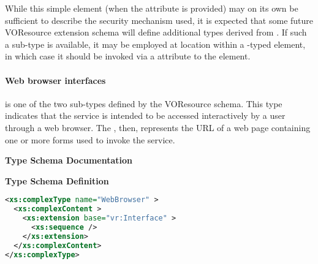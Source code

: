 \documentclass[11pt,a4paper]{ivoa}
\begin{document}

While this simple element (when the  attribute
is provided) may on its own be sufficient to describe the security
mechanism used, it is expected that some future
VOResource extension schema will define
additional types derived from .  If such
a sub-type is available, it may be employed at
 location within a
-typed element, in which case it should be
invoked via a  attribute to the
 element.  


\paragraph{Web browser interfaces}

 is one of the two 
sub-types defined by the VOResource schema.  This type indicates that
the service is intended to be accessed interactively by a user through
a web browser.  The , then, represents
the URL of a web page containing one or more forms used to invoke the
service. 


\begin{generated}
\begingroup
      	\renewcommand*\descriptionlabel[1]{%
      	\hbox to 5.5em{\emph{#1}\hfil}}\vspace{2ex}\noindent\textbf{ Type Schema Documentation}



\vspace{1ex}\noindent\textbf{ Type Schema Definition}

\begin{lstlisting}[language=XML,basicstyle=\footnotesize]
<xs:complexType name="WebBrowser" >
  <xs:complexContent >
    <xs:extension base="vr:Interface" >
      <xs:sequence />
    </xs:extension>
  </xs:complexContent>
</xs:complexType>
\end{lstlisting}\endgroup
\end{generated}
\end{document}
